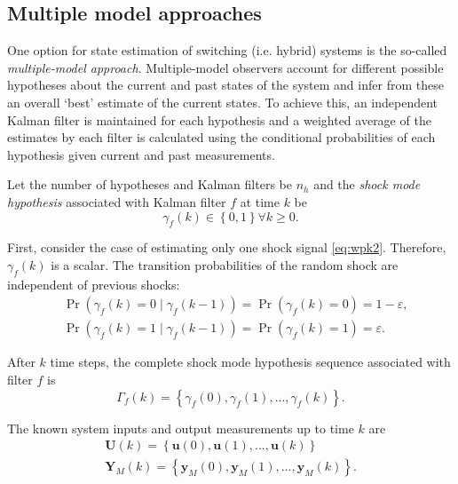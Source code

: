 {{\subsection{Multiple model approaches} \label{sec:multi-model}

One option for state estimation of switching (i.e. hybrid) systems is the so-called \textit{multiple-model approach}. Multiple-model observers account for different possible hypotheses about the current and past states of the system and infer from these an overall `best' estimate of the current states. To achieve this, an independent Kalman filter is maintained for each hypothesis and a weighted average of the estimates by each filter is calculated using the conditional probabilities of each hypothesis given current and past measurements.

Let the number of hypotheses and Kalman filters be $n_h$ and the \textit{shock mode hypothesis} associated with Kalman filter $f$ at time $k$ be
%
\begin{equation} \label{eq:gammak}
	\gamma_{f}(k) \in \left\{0, 1 \right\} \forall{k \ge 0}.
\end{equation}

First, consider the case of estimating only one shock signal \eqref{eq:wpk2}. Therefore, $\gamma_f(k)$ is a scalar. The transition probabilities of the random shock are independent of previous shocks:
%
\begin{equation} \label{eq:Pr_gammak_given_gammakm1}
	\begin{aligned}
		& \Pr\left(\gamma_{f}(k)=0 \mid \gamma_{f}(k-1)\right) = \Pr\left(\gamma_{f}(k)=0\right) = 1-\varepsilon, \\
		& \Pr\left(\gamma_{f}(k)=1 \mid \gamma_{f}(k-1)\right) = \Pr\left(\gamma_{f}(k)=1\right) = \varepsilon.
	\end{aligned}
\end{equation}

After $k$ time steps, the complete shock mode hypothesis sequence associated with filter $f$ is
%
\begin{equation} \label{eq:Gammak}
	\Gamma_f(k) = \left\{ \gamma_f(0), \gamma_f(1), ..., \gamma_f(k) \right\}.
\end{equation}

The known system inputs and output measurements up to time $k$ are
%
%
%
\begin{equation} \label{eq:Uk_Yk}
	\begin{aligned}
		\mathbf{U}(k) = \left\{ \mathbf{u}(0), \mathbf{u}(1), ..., \mathbf{u}(k) \right\} \\
		\mathbf{Y}_M(k) = \left\{ \mathbf{y}_M(0), \mathbf{y}_M(1), ..., \mathbf{y}_M(k) \right\}.
	\end{aligned}
\end{equation}

}}
